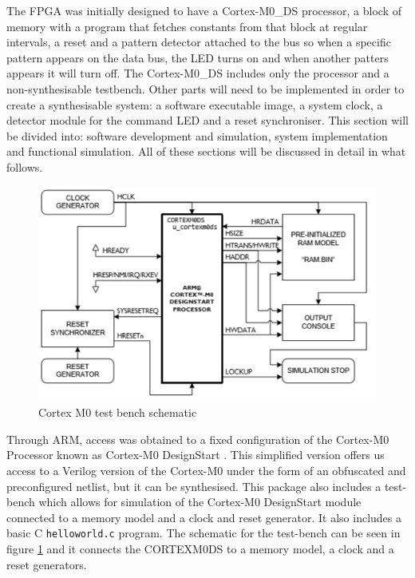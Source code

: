
The FPGA was initially designed to have a Cortex-M0\_DS processor, a block of memory with a program that fetches constants from that block at regular intervals, a reset and a pattern detector attached to the bus so when a specific pattern appears on the data bus, the LED turns on and when another patters appears it will turn off. The Cortex-M0\_DS  includes only the processor and a non-synthesisable testbench. Other parts will need to be implemented in order to create a synthesisable system: a software executable image, a system clock, a detector module for the command LED and a reset synchroniser. This section will be divided into: software development and simulation, system implementation and functional simulation. All of these sections will be discussed in detail in what follows.

\begin{figure}[!h]
	\centering
	\includegraphics[scale=0.7]{figures/test_bench_schematic.PNG}
	\caption{Cortex M0 test bench schematic} \label{fig:test_bench}
\end{figure}

Through ARM, access was obtained to a fixed configuration of the Cortex-M0 Processor known as Cortex-M0 DesignStart \cite{armdesignstart}. This simplified version offers us access to a Verilog version of the Cortex-M0 under the form of an obfuscated and preconfigured netlist, but it can be synthesised. This package also includes a test-bench which allows for simulation of the Cortex-M0 DesignStart module connected to a memory model and a clock and reset generator. It also includes a basic C \verb|helloworld.c| program. The schematic for the test-bench can be seen in figure \ref{fig:test_bench} and it connects the CORTEXM0DS to a memory model, a clock and a reset generators.


